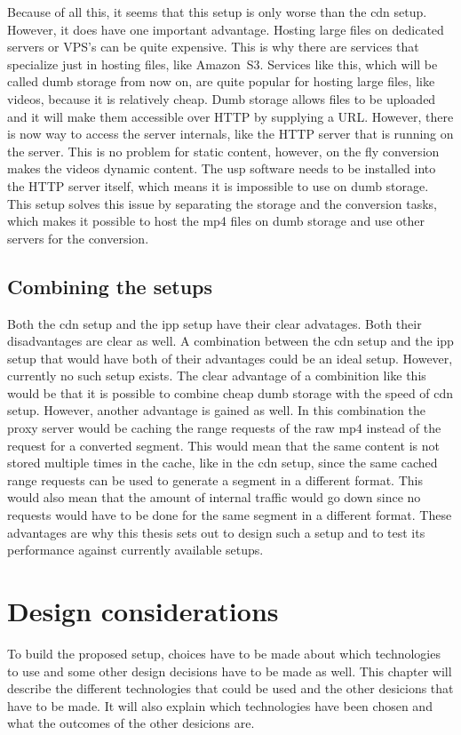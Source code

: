 \documentclass[twoside,openright]{uva-bachelor-thesis}
\begin{document}
Because of all this, it seems that this setup is only worse than the \gls{cdn}
setup. However, it does have one important advantage. Hosting large files on
dedicated servers or VPS’s can be quite expensive. This is why there are
services that specialize just in hosting files, like Amazon~S3. Services like
this, which will be called dumb storage from now on, are quite popular for
hosting large files, like videos, because it is relatively cheap. Dumb storage
allows files to be uploaded and it will make them accessible over HTTP by
supplying a URL\@.  However, there is now way to access the server internals,
like the HTTP server that is running on the server. This is no problem for
static content, however, on the fly conversion makes the videos dynamic content.
The \gls{usp} software needs to be installed into the HTTP server itself, which
means it is impossible to use on dumb storage. This setup solves this issue by
separating the storage and the conversion tasks, which makes it possible to host
the mp4 files on dumb storage and use other servers for the conversion.

\section{Combining the setups}
Both the \gls{cdn} setup and the \gls{ipp} setup have their clear advatages.
Both their disadvantages are clear as well. A combination between the \gls{cdn}
setup and the \gls{ipp} setup that would have both of their advantages could be
an ideal setup. However, currently no such setup exists. The clear advantage
of a combinition like this would be that it is possible to combine cheap dumb
storage with the speed of \gls{cdn} setup. However, another advantage is gained
as well. In this combination the proxy server would be caching the range
requests of the raw mp4 instead of the request for a converted segment. This
would mean that the same content is not stored multiple times in the cache, like
in the \gls{cdn} setup, since the same cached range requests can be used to
generate a segment in a different format. This would also mean that the amount
of internal traffic would go down since no requests would have to be done for
the same segment in a different format. These advantages are why this thesis
sets out to design such a setup and to test its performance against currently
available setups.







\chapter{Design considerations}
To build the proposed setup, choices have to be made about which technologies
to use and some other design decisions have to be made as well. This chapter
will describe the different technologies that could be used and the other
desicions that have to be made. It will also explain which technologies have
been chosen and what the outcomes of the other desicions are.
\end{document}
